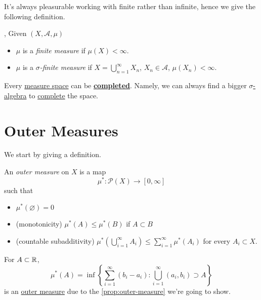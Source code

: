 It's always pleasurable working with finite rather than infinite, hence we give the following definition.
\begin{definition}\label{def:finite-measure},
	Given \((X, \mathcal{A} , \mu)\)
	\begin{itemize}
		\item \(\mu\) is a \emph{finite measure} if \(\mu(X)<\infty \).
		\item \(\mu\) is a \emph{\(\sigma\)-finite measure} if \(X = \bigcup\limits_{n=1}^{\infty} X_{n}\), \(X_{n}\in \mathcal{A} \), \(\mu(X_{n})<\infty \).
	\end{itemize}
\end{definition}

\begin{exercise}
	Every \hyperref[def:measurable-space]{measure space} can be \hyperref[def:complete-measure-space]{\textbf{completed}}. Namely, we can always find a bigger \hyperref[def:sigma-algebra]{\(\sigma\)-algebra} to \hyperref[def:complete-measure-space]{complete} the space.
\end{exercise}

\section{Outer Measures}
We start by giving a definition.

\begin{definition}\label{def:outer-measure}
	An \emph{outer measure} on \(X\) is a map
	\[
		\mu^{*} \colon \mathcal{P} (X)\to [0, \infty ]
	\]
	such that
	\begin{itemize}
		\item\label{def:outer-measure-empty-measure} \(\mu^{*} (\varnothing ) = 0\)
		\item\label{def:outer-measure-montonicity} (monotonicity) \(\mu^{*} (A)\leq \mu^{*} (B)\) if \(A\subset B\)
		\item\label{def:outer-measure-countable-subadditivity} (countable subadditivity) \(\mu^{*} \left(\bigcup\limits_{i=1}^{\infty} A_{i}\right) \leq \sum\limits_{i=1}^{\infty} \mu^{*} (A_{i})\) for every \(A_{i} \subset X \).
	\end{itemize}
\end{definition}

\begin{eg}
	For \(A\subset\mathbb{\MakeUppercase{R}} \),
	\[
		\mu^{*} (A) = \inf \left\{\sum\limits_{i=1}^{\infty} (b_{i} - a_{i}) \colon \bigcup\limits_{i=1}^{\infty} (a_{i}, b_{i})\supset A\right\}
	\]
	is an \hyperref[def:outer-measure]{outer measure} due to the \autoref{prop:outer-measure} we're going to show.
\end{eg}

